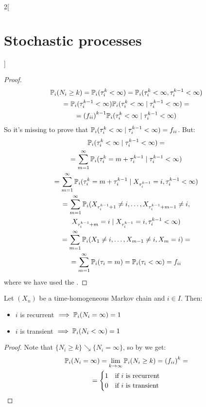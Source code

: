 \documentclass[../../../main_math.tex]{subfiles}
\begin{document}
\begin{multicols}{2}[\section{Stochastic processes}]
\begin{proof}
    \begin{multline*}
      \mathbb{P}_i(N_i\geq k) =\mathbb{P}_i(\tau_i^k<\infty)=\mathbb{P}_i(\tau_i^k<\infty,\tau_i^{k-1}<\infty)\\=\mathbb{P}_i(\tau_i^{k-1}<\infty)\mathbb{P}_i(\tau_i^k<\infty\mid\tau_i^{k-1}<\infty)=\\={(f_{ii})}^{k-1}\mathbb{P}_i(\tau_i^k<\infty\mid\tau_i^{k-1}<\infty)
    \end{multline*}
    So it's missing to prove that $\mathbb{P}_i(\tau_i^k<\infty\mid\tau_i^{k-1}<\infty)={f_{ii}}$. But:
    \begin{multline*}
      \mathbb{P}_i(\tau_i^k<\infty\mid\tau_i^{k-1}<\infty)=\\=\sum_{m=1}^{\infty}\mathbb{P}_i(\tau_i^k=m+\tau_i^{k-1}\mid\tau_i^{k-1}<\infty)\\=\sum_{m=1}^{\infty}\mathbb{P}_i(\tau_i^k=m+\tau_i^{k-1}\mid X_{\tau_i^{k-1}}=i,\tau_i^{k-1}<\infty)
      \\=\sum_{m=1}^{\infty}\mathbb{P}_i( X_{\tau_i^{k-1}+1}\ne i,\ldots,X_{\tau_i^{k-1}+m-1}\ne i,\\X_{\tau_i^{k-1}+m}=i\mid X_{\tau_i^{k-1}}=i,\tau_i^{k-1}<\infty)
      \\=\sum_{m=1}^{\infty}\mathbb{P}_i( X_{1}\ne i,\ldots,X_{m-1}\ne i,X_{m}=i)=\\=\sum_{m=1}^{\infty}\mathbb{P}_i(\tau_i=m)=\mathbb{P}_i(\tau_i<\infty)=f_{ii}
    \end{multline*}
    where we have used the .
  \end{proof}
  \begin{theorem}
    Let $(X_n)$ be a time-homogeneous Markov chain and $i\in I$. Then:
    \begin{itemize}
      \item $i$ is recurrent $\implies\mathbb{P}_i(N_i=\infty)=1$
      \item $i$ is transient $\implies\mathbb{P}_i(N_i<\infty)=1$
    \end{itemize}
  \end{theorem}
  \begin{proof}
    Note that $\{N_i\geq k\}\searrow\{N_i=\infty\}$, so by  we get:
    \begin{multline*}
      \Prob_i(N_i=\infty)=\lim_{k\to\infty}\Prob_i(N_i\geq k)={(f_{ii})}^k=\\=\begin{cases}
        1 & \text{if }i\text{ is recurrent} \\
        0 & \text{if }i\text{ is transient}
      \end{cases}

\end{multline*}
\end{proof}
\end{multicols}
\end{document}
